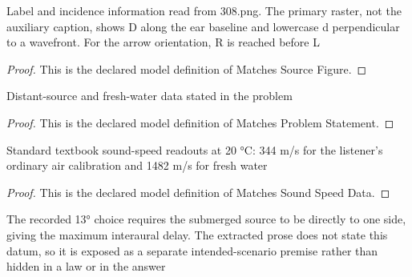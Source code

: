 \begin{definition}
  \label{def:physics:phyx-mini-0308:phyxminiproblems-problemphyxmini0308-matchessourcefigure}
  Label and incidence information read from 308.png. The primary raster, not the auxiliary caption, shows D along the ear baseline and lowercase d perpendicular to a wavefront. For the arrow orientation, R is reached before L
\end{definition}
\begin{proof}
  This is the declared model definition of Matches Source Figure.
\end{proof}
\begin{definition}
  \label{def:physics:phyx-mini-0308:phyxminiproblems-problemphyxmini0308-matchesproblemstatement}
  Distant-source and fresh-water data stated in the problem
\end{definition}
\begin{proof}
  This is the declared model definition of Matches Problem Statement.
\end{proof}
\begin{definition}
  \label{def:physics:phyx-mini-0308:phyxminiproblems-problemphyxmini0308-matchessoundspeeddata}
  Standard textbook sound-speed readouts at 20 °C: 344 m/s for the listener's ordinary air calibration and 1482 m/s for fresh water
\end{definition}
\begin{proof}
  This is the declared model definition of Matches Sound Speed Data.
\end{proof}
\begin{definition}
  \label{def:physics:phyx-mini-0308:phyxminiproblems-problemphyxmini0308-matchesintendedsideonarrival}
  The recorded 13° choice requires the submerged source to be directly to one side, giving the maximum interaural delay. The extracted prose does not state this datum, so it is exposed as a separate intended-scenario premise rather than hidden in a law or in the answer
\end{definition}
